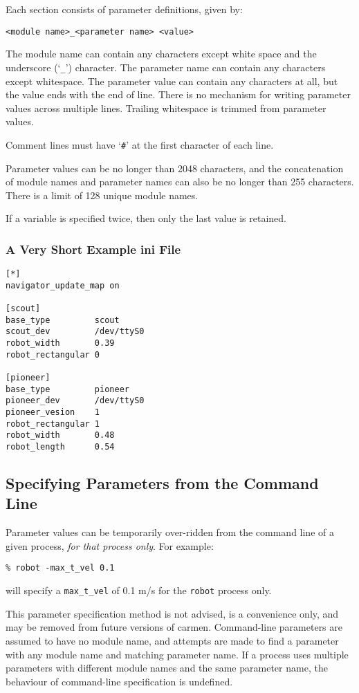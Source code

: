 \documentclass{article}
\begin{document}
Each section consists of parameter definitions, given by:
\begin{verbatim}
<module name>_<parameter name> <value>
\end{verbatim}

The module name can contain any characters except white space and the
underscore (`\verb!_!') character. The parameter name can contain any
characters except whitespace. The parameter value can contain any characters
at all, but the value ends with the end of line. There is no mechanism for
writing parameter values across multiple lines. Trailing whitespace is trimmed
from parameter values. 

Comment lines must have `\verb!#!' at the first character of each line. 

Parameter values can be no longer than 2048 characters, and the concatenation
of module names and parameter names can also be no longer than 255
characters. There is a limit of 128 unique module names.

If a variable is specified twice, then only the last value is retained.

\subsubsection*{A Very Short Example ini File}

\begin{verbatim}
[*]
navigator_update_map on

[scout]
base_type         scout
scout_dev         /dev/ttyS0
robot_width       0.39
robot_rectangular 0

[pioneer]
base_type         pioneer
pioneer_dev       /dev/ttyS0
pioneer_vesion    1
robot_rectangular 1
robot_width       0.48
robot_length      0.54
\end{verbatim}

\subsection{Specifying Parameters from the Command Line}

Parameter values can be temporarily over-ridden from the command line of a
given process, \emph{for that process only}. For example:
\begin{verbatim}
% robot -max_t_vel 0.1
\end{verbatim}
will specify a \verb!max_t_vel! of 0.1 m/s for the \verb!robot! process only. 

This parameter specification method is not advised, is a convenience only, and
may be removed from future versions of carmen. Command-line parameters are
assumed to have no module name, and attempts are made to find a parameter with
any module name and matching parameter name. If a process uses multiple
parameters with different module names and the same parameter name, the
behaviour of command-line specification is undefined.
\end{document}
